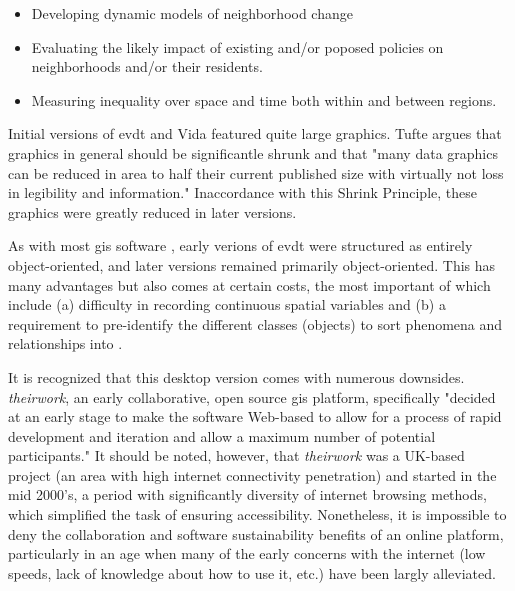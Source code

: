 \begin{itemize}[itemsep=0pt,parsep=0pt]
	\item{Developing dynamic models of neighborhood change}
	\item{Evaluating the likely impact of existing and/or poposed policies on neighborhoods and/or their residents.}
	\item{Measuring inequality over space and time both within and between regions.}
\end{itemize}



Initial versions of \ac{evdt} and Vida featured quite large graphics. Tufte argues that graphics in general should be significantle shrunk and that "many data graphics can be reduced in area to half their current published size with virtually not loss in legibility and information." \cite{tufteVisualDisplayQuantitative2001} Inaccordance with this Shrink Principle, these graphics were greatly reduced in later versions.

As with most \ac{gis} software \cite{heikkilaGISDeadLong1998}, early verions of \ac{evdt} were structured as entirely object-oriented, and later versions remained primarily object-oriented. This has many advantages but also comes at certain costs, the most important of which include (a) difficulty in recording continuous spatial variables and (b) a requirement to pre-identify the different classes (objects) to sort phenomena and relationships into \cite{goodchildModelingEarth2011}. 

It is recognized that this desktop version comes with numerous downsides. \textit{theirwork}, an early collaborative, open source \ac{gis} platform, specifically "decided at an early stage to make the software Web-based to allow for a process of rapid development and iteration and allow a maximum number of potential participants." \cite{williamsonTheirworkDevelopmentSustainable2011} It should be noted, however, that \textit{theirwork} was a UK-based project (an area with high internet connectivity penetration) and started in the mid 2000's, a period with significantly diversity of internet browsing methods, which simplified the task of ensuring accessibility. Nonetheless, it is impossible to deny the collaboration and software sustainability benefits of an online platform, particularly in an age when many of the early concerns with the internet (low speeds, lack of knowledge about how to use it, etc.) \cite{shifterInteractiveMultimediaPlanning1995} have been largly alleviated.

